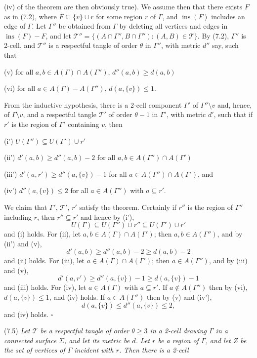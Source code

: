 \hspace*{12pt}(iv) of the theorem are then obviously true). We assume then that there exists $F$ as in (7.2), where $F \subseteq \{v\} \cup r$ for some region $r$ of $\Gamma$, and $\operatorname{ins}(F)$ includes an edge of $\Gamma$. Let $\Gamma''$ be obtained from $\Gamma$ by deleting all vertices and edges in $\operatorname{ins}(F) - F$, and let $\mathscr{T}'' = \{(A \cap \Gamma'', B \cap \Gamma'') : (A, B) \in \mathscr{T}\}$. By (7.2), $\Gamma''$ is 2-cell, and $\mathscr{T}''$ is a respectful tangle of order $\theta$ in $\Gamma''$, with metric $d''$ say, such that

\hspace*{12pt}(v) for all $a, b \in A(\Gamma) \cap A(\Gamma'')$, $d''(a, b) \ge d(a, b)$

\hspace*{12pt}(vi) for all $a \in A(\Gamma) - A(\Gamma'')$, $d(a, \{v\}) \le 1$.

From the inductive hypothesis, there is a 2-cell component $\Gamma'$ of $\Gamma'' \setminus v$ and, hence, of $\Gamma \setminus v$, and a respectful tangle $\mathscr{T}'$ of order $\theta - 1$ in $\Gamma'$, with metric $d'$, such that if $r'$ is the region of $\Gamma'$ containing $v$, then

(i') $U(\Gamma'') \subseteq U(\Gamma') \cup r'$

(ii') $d'(a, b) \ge d''(a, b) - 2$ for all $a, b \in A(\Gamma'') \cap A(\Gamma')$

(iii') $d'(a, r') \ge d''(a, \{v\}) - 1$ for all $a \in A(\Gamma'') \cap A(\Gamma')$, and

(iv') $d''(a, \{v\}) \le 2$ for all $a \in A(\Gamma'')$ with $a \subseteq r'$.

We claim that $\Gamma'$, $\mathscr{T}'$, $r'$ satisfy the theorem. Certainly if $r''$ is the region of $\Gamma''$ including $r$, then $r'' \subseteq r'$ and hence by (i'),
\begin{equation*}
U(\Gamma) \subseteq U(\Gamma'') \cup r'' \subseteq U(\Gamma') \cup r'
\end{equation*}
and (i) holds. For (ii), let $a, b \in A(\Gamma) \cap A(\Gamma')$; then $a, b \in A(\Gamma'')$, and by (ii') and (v),
\begin{equation*}
d'(a, b) \ge d''(a, b) - 2 \ge d(a, b) - 2
\end{equation*}
and (ii) holds. For (iii), let $a \in A(\Gamma) \cap A(\Gamma')$; then $a \in A(\Gamma'')$, and by (iii) and (v),
\begin{equation*}
d'(a, r') \ge d''(a, \{v\}) - 1 \ge d(a, \{v\}) - 1
\end{equation*}
and (iii) holds. For (iv), let $a \in A(\Gamma)$ with $a \subseteq r'$. If $a \notin A(\Gamma'')$ then by (vi), $d(a, \{v\}) \le 1$, and (iv) holds. If $a \in A(\Gamma'')$ then by (v) and (iv'),
\begin{equation*}
d(a, \{v\}) \le d''(a, \{v\}) \le 2,
\end{equation*}
and (iv) holds. $\square$

\stmt
(7.5) \textit{Let $\mathscr{T}$ be a respectful tangle of order $\theta \ge 3$ in a 2-cell drawing $\Gamma$ in a connected surface $\Sigma$, and let its metric be $d$. Let $r$ be a region of $\Gamma$, and let $Z$ be the set of vertices of $\Gamma$ incident with $r$. Then there is a 2-cell}
